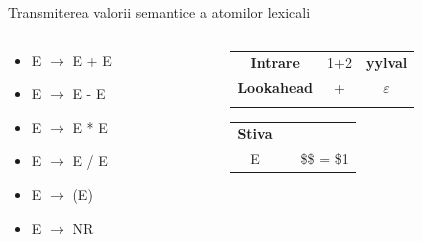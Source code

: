 \documentclass[pdf]{beamer}
\begin{document}
\begin{frame}{Transmiterea valorii semantice a atomilor lexicali}
\begin{columns}
\begin{column}{0.5\textwidth}
\begin{itemize}
	\item
	E $\rightarrow$ E + E

	\item
	E $\rightarrow$ E - E

	\item
	E $\rightarrow$ E * E

	\item
	E $\rightarrow$ E / E

	\item
	E $\rightarrow$ (E)

	\item
	E $\rightarrow$ NR

\end{itemize}
\end{column}

\begin{column}{0.4\textwidth}

\begin{tabular}{ccc|} \cline{1-3}
\multicolumn{1}{|c}{\textbf{Intrare}} & {1+2} & {\textbf{yylval}} \\ \cline{1-3}
\multicolumn{1}{|c}{\textbf{Lookahead}} & + & $\varepsilon$ \\ \cline{1-3} \\
\end{tabular}
\begin{tabular}{cc|c|}
\cline{1-1}
\multicolumn{1}{|c|}{\textbf{Stiva}} & \hspace{0.75cm}\\
\multicolumn{1}{|c|}{E} & \hspace{0.75cm} & \$\$ = \$1\\
\cline{1-1}
\end{tabular}

\end{column}
\end{columns}
\end{frame}
\end{document}
